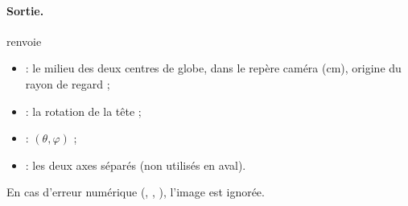 \paragraph{Sortie.}  renvoie
\begin{itemize}
  \item {} : le milieu des deux centres de globe, dans le repère caméra (cm), origine du rayon de regard ;
  \item {} : la rotation de la tête ;
  \item {} : $(\theta, \varphi)$ ;
  \item {} : les deux axes séparés (non utilisés en aval).
\end{itemize}
En cas d'erreur numérique (, , ), l'image est ignorée.

